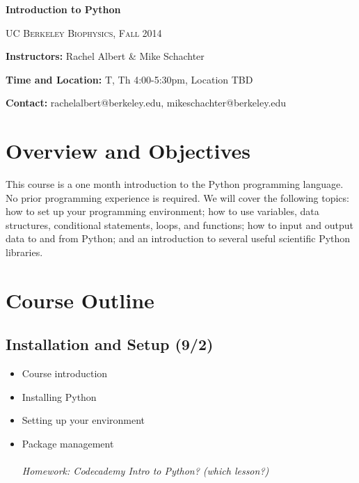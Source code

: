 \documentclass[12pt]{article}
\begin{document}
\thispagestyle{plain} %






\begin{center}
\LARGE{\bf{Introduction to Python}}

\textsc{UC Berkeley Biophysics, Fall 2014} \bigskip

\end{center}

\noindent\textbf{Instructors: }Rachel Albert \& Mike Schachter\medskip

\noindent\textbf{Time and Location:} T, Th 4:00-5:30pm, Location TBD\medskip

\noindent\textbf{Contact:} rachelalbert@berkeley.edu, mikeschachter@berkeley.edu\medskip

\bigskip

\section*{Overview and Objectives}%
This course is a one month introduction to the Python programming language. No prior programming experience is required. We will cover the following topics: how to set up your programming environment; how to use variables, data structures, conditional statements, loops, and functions; how to input and output data to and from Python; and an introduction to several useful scientific Python libraries.

\section*{Course Outline}

\subsection*{Installation and Setup \textnormal{\small{(9/2)} }}
\begin{itemize}
\item Course introduction
\item Installing Python
\item Setting up your environment
\item Package management \\\\
\it{Homework: Codecademy Intro to Python? (which lesson?)}
\end{itemize}
\end{document}
